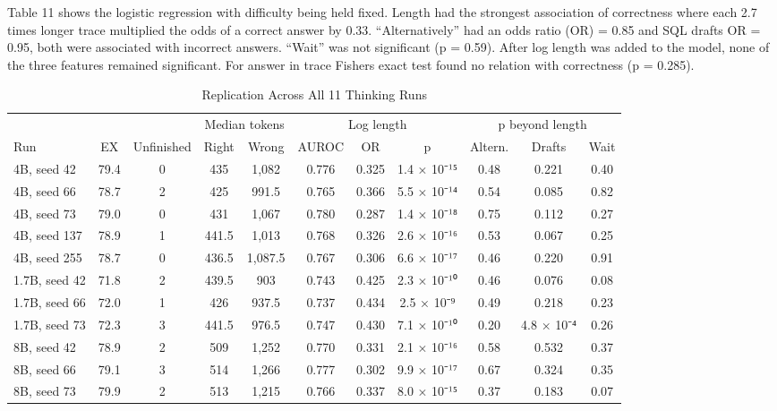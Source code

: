 Table 11 shows the logistic regression with difficulty being held fixed. Length had the strongest association of correctness where each 2.7 times longer trace multiplied the odds of a correct answer by 0.33. ``Alternatively'' had an odds ratio (OR) = 0.85 and SQL drafts OR = 0.95, both were associated with incorrect answers. ``Wait'' was not significant (p = 0.59). After log length was added to the model, none of the three features remained significant. For answer in trace Fisher\textquotesingle s exact test found no relation with correctness (p = 0.285).

\begin{table}[!htbp]
\centering
\caption{Replication Across All 11 Thinking Runs}
\label{tab:12}
\small
\begin{adjustbox}{max width=\linewidth}
\begin{tabular}{@{}lcccccccccc@{}}
\toprule
 &  &  & \multicolumn{2}{c}{Median tokens} & \multicolumn{3}{c}{Log length} & \multicolumn{3}{c}{p beyond length} \\
\cmidrule(lr){4-5}\cmidrule(lr){6-8}\cmidrule(lr){9-11}
Run & EX & Unfinished & Right & Wrong & AUROC & OR & p & Altern. & Drafts & Wait \\
\midrule
4B, seed 42 & 79.4 & 0 & 435 & 1,082 & 0.776 & 0.325 & 1.4 × 10⁻¹⁵ & 0.48 & 0.221 & 0.40 \\
4B, seed 66 & 78.7 & 2 & 425 & 991.5 & 0.765 & 0.366 & 5.5 × 10⁻¹⁴ & 0.54 & 0.085 & 0.82 \\
4B, seed 73 & 79.0 & 0 & 431 & 1,067 & 0.780 & 0.287 & 1.4 × 10⁻¹⁸ & 0.75 & 0.112 & 0.27 \\
4B, seed 137 & 78.9 & 1 & 441.5 & 1,013 & 0.768 & 0.326 & 2.6 × 10⁻¹⁶ & 0.53 & 0.067 & 0.25 \\
4B, seed 255 & 78.7 & 0 & 436.5 & 1,087.5 & 0.767 & 0.306 & 6.6 × 10⁻¹⁷ & 0.46 & 0.220 & 0.91 \\
1.7B, seed 42 & 71.8 & 2 & 439.5 & 903 & 0.743 & 0.425 & 2.3 × 10⁻¹⁰ & 0.46 & 0.076 & 0.08 \\
1.7B, seed 66 & 72.0 & 1 & 426 & 937.5 & 0.737 & 0.434 & 2.5 × 10⁻⁹ & 0.49 & 0.218 & 0.23 \\
1.7B, seed 73 & 72.3 & 3 & 441.5 & 976.5 & 0.747 & 0.430 & 7.1 × 10⁻¹⁰ & 0.20 & 4.8 × 10⁻⁴ & 0.26 \\
8B, seed 42 & 78.9 & 2 & 509 & 1,252 & 0.770 & 0.331 & 2.1 × 10⁻¹⁶ & 0.58 & 0.532 & 0.37 \\
8B, seed 66 & 79.1 & 3 & 514 & 1,266 & 0.777 & 0.302 & 9.9 × 10⁻¹⁷ & 0.67 & 0.324 & 0.35 \\
8B, seed 73 & 79.9 & 2 & 513 & 1,215 & 0.766 & 0.337 & 8.0 × 10⁻¹⁵ & 0.37 & 0.183 & 0.07 \\
\bottomrule
\end{tabular}
\end{adjustbox}
\par{}
\end{table}

